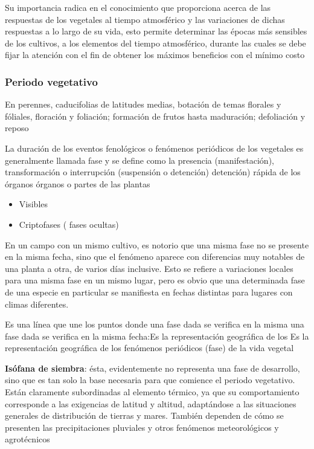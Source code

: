 Su importancia radica en el conocimiento que proporciona acerca de las respuestas de los vegetales al tiempo atmosférico y las variaciones de dichas respuestas a lo largo de su vida, esto permite determinar las épocas más sensibles de los cultivos, a los elementos del tiempo atmosférico, durante las cuales se debe fijar la atención con el fin de obtener los máximos beneficios con el mínimo costo

\subsubsection{Periodo vegetativo}

En perennes, caducifolias de latitudes medias, botación de temas florales y fóliales, floración y foliación; formación de frutos hasta maduración; defoliación y reposo

La duración de los eventos fenológicos o fenómenos periódicos de los vegetales es generalmente llamada fase y se define como la presencia (manifestación), transformación o interrupción (suspensión o detención) detención) rápida de los órganos órganos o partes de las plantas

\begin{itemize}
    \item Visibles
    \item Criptofases ( fases ocultas)
\end{itemize}

En un campo con un mismo cultivo, es notorio que una misma fase no se presente en la misma fecha, sino que el fenómeno aparece con diferencias muy notables de una planta a otra, de varios días inclusive. Esto se refiere a variaciones locales para una misma fase en un mismo lugar, pero es obvio que una determinada fase de una especie en particular se manifiesta en fechas distintas para lugares con climas diferentes.

\begin{definition}[Isófana]
    Es una línea que une los puntos donde una fase dada se verifica en la misma una fase dada se verifica en la misma fecha:Es la representación geográfica de los Es la representación geográfica de los fenómenos periódicos (fase) de la vida vegetal
\end{definition}

\textbf{Isófana de siembra}: ésta, evidentemente no representa una fase de desarrollo, sino que es tan solo la base necesaria para que comience el periodo vegetativo. Están claramente subordinadas al elemento térmico, ya que su comportamiento corresponde a las exigencias de latitud y altitud, adaptándose a las situaciones generales de distribución de tierras y mares. También dependen de cómo se presenten las precipitaciones pluviales y otros fenómenos meteorológicos y agrotécnicos

